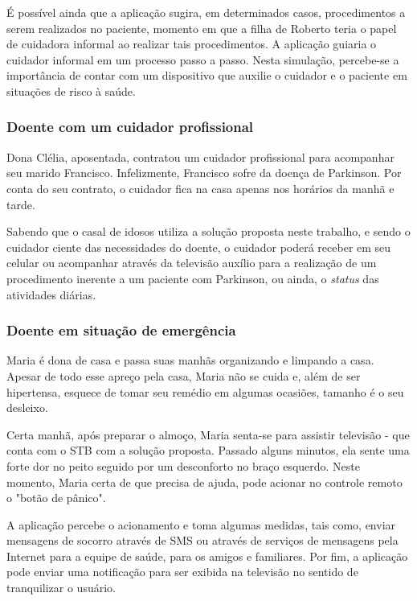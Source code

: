 É possível ainda que a aplicação sugira, em determinados casos, procedimentos a
serem realizados no paciente, momento em que a filha de Roberto teria o papel de
cuidadora informal ao realizar tais procedimentos. A aplicação guiaria o
cuidador informal em um processo passo a passo. Nesta simulação,  percebe-se a
importância de contar com um dispositivo que auxilie o cuidador e o paciente em
situações de risco à saúde.

\subsubsection{Doente com um cuidador profissional} \label{subsubsec:doente-cuidador}

Dona Clélia, aposentada, contratou um cuidador profissional para acompanhar seu
marido Francisco. Infelizmente, Francisco sofre da doença de Parkinson. Por conta
do seu contrato, o cuidador fica na casa apenas nos horários da manhã e tarde.

Sabendo que o casal de idosos utiliza a solução proposta neste trabalho, e sendo o
cuidador ciente das necessidades do doente, o cuidador poderá receber em seu celular ou
acompanhar através da televisão auxílio para a realização de um procedimento inerente
a um paciente com Parkinson, ou ainda, o \textit{status} das atividades diárias.

\subsubsection{Doente em situação de emergência} \label{subsubsec:doente-emergencia}

Maria é dona de casa e passa suas manhãs organizando e limpando a casa. Apesar
de todo esse apreço pela casa, Maria não se cuida e, além de ser hipertensa,
esquece de tomar seu remédio em algumas ocasiões, tamanho é o seu desleixo.

Certa manhã, após preparar o almoço, Maria senta-se para assistir televisão -
que conta com o STB com a solução proposta. Passado alguns minutos, ela sente
uma forte dor no peito seguido por um desconforto no braço esquerdo. Neste
momento, Maria certa de que precisa de ajuda, pode acionar no controle remoto o
"botão de pânico". 

A aplicação percebe o acionamento e toma algumas medidas, tais como, enviar
mensagens de socorro através de SMS ou através de serviços de mensagens pela
Internet para a equipe de saúde, para os amigos e familiares.  Por fim, a
aplicação pode enviar uma notificação para ser exibida na televisão no sentido
de tranquilizar o usuário.

